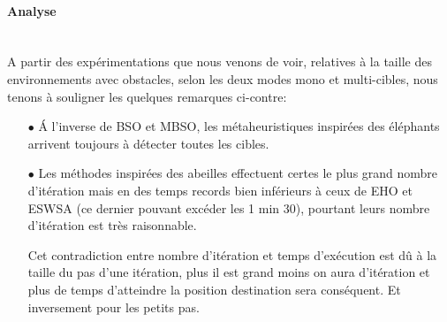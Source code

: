 \noindent
\begin{minipage}[t]{0.55\textwidth}
	\captionsetup{width=0.8\linewidth}
	\centering{}
	\label{IS5o}
\end{minipage}\hfill
\hspace{-0.5cm}
\begin{minipage}[t]{0.55\textwidth}
	\captionsetup{width=0.8\linewidth}
	\centering{}
	\label{tS5o}
\end{minipage}\hfill





\paragraph{Analyse}
\textbf{}\\
A partir des expérimentations que nous venons de voir, relatives à la taille des environnements avec obstacles, selon les deux modes mono et multi-cibles, nous tenons à souligner les quelques remarques ci-contre:
\begin{itemize}
	\item[$\bullet$] \'{A} l'inverse de BSO et MBSO, les métaheuristiques inspirées des éléphants arrivent toujours à détecter toutes les cibles.
	\item[$\bullet$] Les méthodes inspirées des abeilles effectuent certes le plus grand nombre d'itération mais en des temps records bien inférieurs à ceux de EHO et ESWSA (ce dernier pouvant excéder les 1 min 30), pourtant leurs nombre d'itération est très raisonnable.
	
	Cet contradiction entre nombre d'itération et temps d'exécution est dû à la taille du pas d'une itération, plus il est grand moins on aura d'itération et plus de temps d'atteindre la position destination sera conséquent. Et inversement pour les petits pas. 
	
\end{itemize} 




